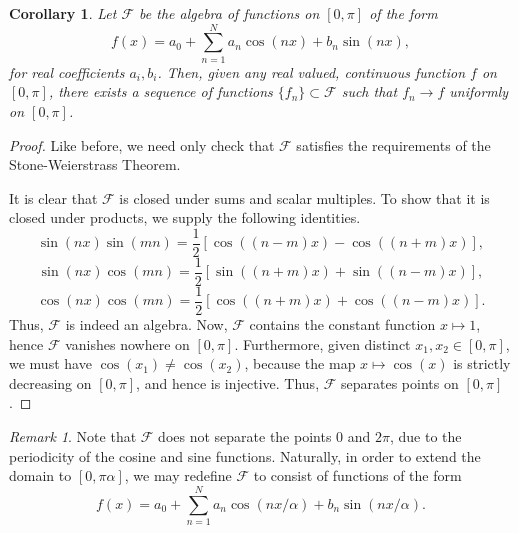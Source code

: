 \documentclass[11pt]{article}
\newtheorem{corollary}{Corollary}[theorem]
\theoremstyle{definition}
\theoremstyle{remark}
\newtheorem*{remark}{Remark}
\begin{document}
    \begin{corollary}
        Let $\mathscr{F}$ be the algebra of functions on $[0, \pi]$ of the form \[
            f(x) = a_0 + \sum_{n = 1}^N a_n \cos(nx) + b_n\sin(nx),
        \] for real coefficients $a_i, b_i$. Then, given any real valued, continuous
        function $f$ on $[0, \pi]$, there exists a sequence of functions $\{f_n\}
        \subset \mathscr{F}$ such that $f_n \to f$ uniformly on $[0,
        \pi]$.
    \end{corollary}
    \begin{proof}
        Like before, we need only check that $\mathscr{F}$ satisfies the requirements
        of the Stone-Weierstrass Theorem.

        It is clear that $\mathscr{F}$ is closed under sums and scalar multiples. To
        show that it is closed under products, we supply the following identities. \[
            \sin(nx)\sin(mn) = \frac{1}{2}\left[\cos((n - m)x) - \cos((n + m)x)
            \right],
        \] \[
            \sin(nx)\cos(mn) = \frac{1}{2}\left[\sin((n + m)x) + \sin((n - m)x)
            \right],
        \] \[
            \cos(nx)\cos(mn) = \frac{1}{2}\left[\cos((n + m)x) + \cos((n - m)x)
            \right].
        \] Thus, $\mathscr{F}$ is indeed an algebra. Now, $\mathscr{F}$ contains the
        constant function $x \mapsto 1$, hence $\mathscr{F}$ vanishes nowhere on
        $[0, \pi]$. Furthermore, given distinct $x_1, x_2 \in [0, \pi]$, we must have
        $\cos(x_1) \neq \cos(x_2)$, because the map $x \mapsto \cos(x)$ is strictly
        decreasing on $[0, \pi]$, and hence is injective. Thus, $\mathscr{F}$
        separates points on $[0, \pi]$.

    \end{proof}
    \begin{remark}
        Note that $\mathscr{F}$ does not separate the points $0$ and $2\pi$, due to
        the periodicity of the cosine and sine functions. Naturally, in order to
        extend the domain to $[0, \pi\alpha]$, we may redefine $\mathscr{F}$ to
        consist of functions of the form \[
            f(x) = a_0 + \sum_{n = 1}^N a_n \cos(nx / \alpha) + b_n\sin(nx/\alpha).
        \] 
    \end{remark}
\end{document}
